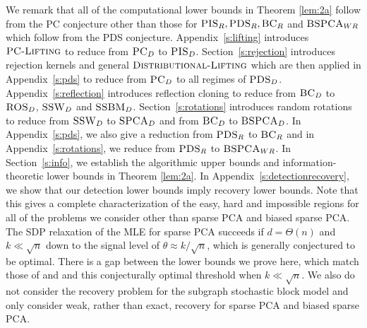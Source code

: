 We remark that all of the computational lower bounds in Theorem \ref{lem:2a} follow from the PC conjecture other than those for $\textsc{PIS}_R, \textsc{PDS}_R, \textsc{BC}_R$ and $\textsc{BSPCA}_{WR}$ which follow from the PDS conjecture.
Appendix~\ref{s:lifting} introduces $\textsc{PC-Lifting}$ to reduce from $\textsc{PC}_D$ to $\textsc{PIS}_D$. Section~\ref{s:rejection} introduces rejection kernels and general $\textsc{Distributional-Lifting}$ which are then applied in Appendix~\ref{s:pds} to reduce from $\textsc{PC}_D$ to all regimes of $\textsc{PDS}_D$. Appendix~\ref{s:reflection} introduces reflection cloning to reduce from $\textsc{BC}_D$ to $\textsc{ROS}_D$, $\textsc{SSW}_D$ and $\textsc{SSBM}_D$. Section~\ref{s:rotations} introduces random rotations to reduce from $\textsc{SSW}_D$ to $\textsc{SPCA}_D$ and from $\textsc{BC}_D$ to $\textsc{BSPCA}_D$. In Appendix~\ref{s:pds}, we also give a reduction from $\textsc{PDS}_R$ to $\textsc{BC}_R$ and in Appendix~\ref{s:rotations}, we reduce from $\textsc{PDS}_R$ to $\textsc{BSPCA}_{WR}$. In Section~\ref{s:info}, we establish the algorithmic upper bounds and information-theoretic lower bounds in Theorem \ref{lem:2a}. In Appendix~\ref{s:detectionrecovery}, we show that our detection lower bounds imply recovery lower bounds. Note that this gives a complete characterization of the easy, hard and impossible regions for all of the problems we consider other than sparse PCA and biased sparse PCA. The SDP relaxation of the MLE for sparse PCA succeeds if $d = \Theta(n)$ and $k \ll \sqrt{n}$ down to the signal level of $\theta \approx k/\sqrt{n}$, which is generally conjectured to be optimal. There is a gap between the lower bounds we prove here, which match those of \cite{berthet2013optimal} and \cite{gao2017sparse} and this conjecturally optimal threshold when $k \ll \sqrt{n}$.
We also do not consider the recovery problem for the subgraph stochastic block model and only consider weak, rather than exact, recovery for sparse PCA and biased sparse PCA.

